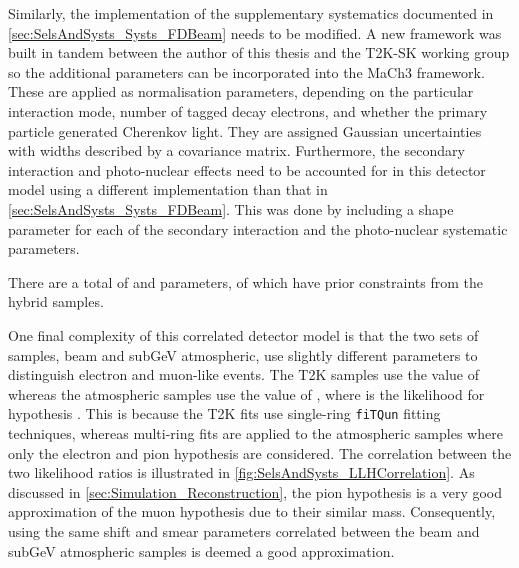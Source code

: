 Similarly, the implementation of the supplementary systematics documented in \autoref{sec:SelsAndSysts_Systs_FDBeam} needs to be modified. A new framework \cite{t2ksk-common} was built in tandem between the author of this thesis and the T2K-SK working group \cite{t2k_tn_399} so the additional parameters can be incorporated into the MaCh3 framework. These are applied as normalisation parameters, depending on the particular interaction mode, number of tagged decay electrons, and whether the primary particle generated Cherenkov light. They are assigned Gaussian uncertainties with widths described by a covariance matrix. Furthermore, the secondary interaction and photo-nuclear effects need to be accounted for in this detector model using a different implementation than that in \autoref{sec:SelsAndSysts_Systs_FDBeam}. This was done by including a shape parameter for each of the secondary interaction and the photo-nuclear systematic parameters.

There are a total of   and  parameters, of which  have prior constraints from the hybrid  samples.

One final complexity of this correlated detector model is that the two sets of samples, beam and subGeV atmospheric, use slightly different parameters to distinguish electron and muon-like events. The T2K samples use the value of  whereas the atmospheric samples use the value of , where  is the likelihood for hypothesis . This is because the T2K fits use single-ring \texttt{fiTQun} fitting techniques, whereas multi-ring fits are applied to the atmospheric samples where only the electron and pion hypothesis are considered. The correlation between the two likelihood ratios is illustrated in \autoref{fig:SelsAndSysts_LLHCorrelation}. As discussed in \autoref{sec:Simulation_Reconstruction}, the pion hypothesis is a very good approximation of the muon hypothesis due to their similar mass. Consequently, using the same shift and smear parameters correlated between the beam and subGeV atmospheric samples is deemed a good approximation.

